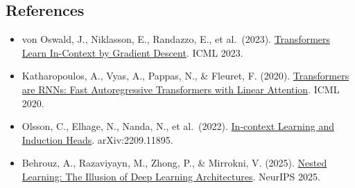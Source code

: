 \FloatBarrier
{}
\hypertarget{references-72}{%
\subsection{References}\label{references-72}}

\vspace{0.25em}
\begin{itemize}
\tightlist
\item
  von Oswald, J., Niklasson, E., Randazzo, E., et al.~(2023). \href{https://arxiv.org/abs/2212.07677}{Transformers Learn In-Context by Gradient Descent}. ICML 2023.
\item
  Katharopoulos, A., Vyas, A., Pappas, N., \& Fleuret, F. (2020). \href{https://arxiv.org/abs/2006.16236}{Transformers are RNNs: Fast Autoregressive Transformers with Linear Attention}. ICML 2020.
\item
  Olsson, C., Elhage, N., Nanda, N., et al.~(2022). \href{https://arxiv.org/abs/2209.11895}{In-context Learning and Induction Heads}. arXiv:2209.11895.
\item
  Behrouz, A., Razaviyayn, M., Zhong, P., \& Mirrokni, V. (2025). \href{https://arxiv.org/abs/2512.24695}{Nested Learning: The Illusion of Deep Learning Architectures}. NeurIPS 2025.
\end{itemize}

\clearpage
